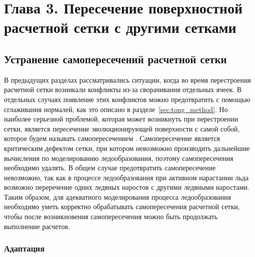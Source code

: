 \newpage
\section*{Глава 3. Пересечение поверхностной расчетной сетки с другими сетками} %
\addtocounter{section}{1}                                                                             %
\setcounter{subsection}{0}
\setcounter{figure}{0}
\setcounter{equation}{0}
\setcounter{table}{0}
\setcounter{theorem}{0}
\setcounter{lemma}{0}
\setcounter{definition}{0}


\subsection{Устранение самопересечений расчетной сетки}

В предыдущих разделах рассматривались ситуации, когда во время перестроения расчетной сетки возникали конфликты из-за сворачивания отдельных ячеек.
В отдельных случаях появление этих конфликтов можно предотвратить с помощью сглаживания нормалей, как это описано в разделе~\ref{sec:tong_method}.
Но наиболее серьезной проблемой, которая может возникнуть при перестроении сетки, является пересечение эволюционирующей поверхности с самой собой, которое будем называть самопересечением \cite{Freylekhman2022GeoIntersect}\label{term:mesh_self_intersect}.
Самопересечение является критическим дефектом сетки, при котором невозможно производить дальнейшие вычисления по моделированию ледообразования, поэтому самопересечения необходимо удалять.
В общем случае предотвратить самопересечение невозможно, так как в процессе ледообразования при активном нарастании льда возможно переречение одних ледяных наростов с другими ледяными наростами.
Таким образом, для адекватного моделирования процесса ледообразования необходимо уметь корректно обрабатывать самопересечения расчетной сетки, чтобы после возникновения самопересечения можно быть продолжать выполнение расчетов.

\subsubsection{Адаптация}

